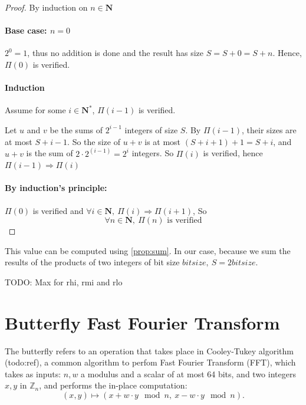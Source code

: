 \documentclass[a4paper]{article}
\begin{document}
\begin{proof}
    By induction on $n\in\mathbf{N}$

    \paragraph{Base case: $n = 0$}
    $2^0 = 1$, thus no addition is done and the result has size $S = S + 0 = S + n$. Hence, $\Pi(0)$ is verified.

    \paragraph{Induction}
    Assume for some $i \in \mathbf{N}^*$, $\Pi(i - 1)$ is verified.

    Let $u$ and $v$ be the sums of $2^{i-1}$ integers of size $ S $. By $\Pi(i-1)$, their sizes are at most $S + i - 1$. So the size of $u + v$ is at most $\left(S + i + 1\right) + 1 = S + i$, and $u + v$ is the sum of $2 \cdot 2^(i-1) = 2^i$ integers.
    So $\Pi(i)$ is verified, hence $\Pi(i-1) \Rightarrow \Pi(i)$

    \paragraph{By induction's principle:} $\Pi(0)$ is verified and $\forall i\in\mathbf{N},\ \Pi(i) \Rightarrow \Pi(i+1)$, So
    \begin{displaymath}
        \forall n\in\mathbf{N},\ \Pi(n)\text{ is verified}
    \end{displaymath}
\end{proof}

This value can be computed using \ref{prop:sum}. In our case, because we sum the results of the products of two integers of bit size $bitsize,\ S = 2 bitsize$.

TODO: Max for rhi, rmi and rlo



\section{Butterfly Fast Fourier Transform}

The butterfly refers to an operation that takes place in Cooley-Tukey algorithm (todo:ref), a common algorithm to perfom 
Fast Fourier Transform (FFT), which takes as inputs: $n, w$ a modulus and a scalar of at most 64 bits, and two integers 
$x, y$ in $\mathbb{Z}_n$, and performs the in-place computation:
\[
(x,y) \mapsto (x + w\cdot y \mod n,\ x - w\cdot y \mod n).
\]
\end{document}
